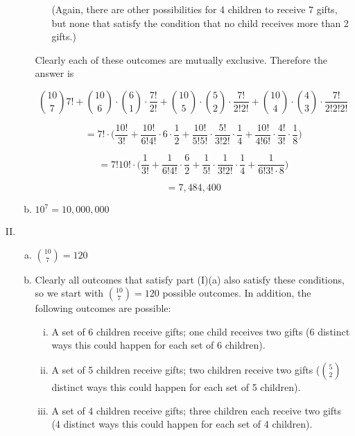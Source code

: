 \begin{enumerate}[(I)]
\begin{enumerate}[(a)]
\begin{enumerate}[(i)]
(Again, there are other possibilities for 4 children to receive 7 gifts, but none that satisfy the condition that no child receives more than 2 gifts.)

\end{enumerate}

Clearly each of these outcomes are mutually exclusive. Therefore the answer is

\[
\binom{10}{7}7! + \binom{10}{6} \cdot \binom{6}{1} \cdot \frac{7!}{2!} + \binom{10}{5} \cdot \binom{5}{2} \cdot \frac{7!}{2!2!} + \binom{10}{4} \cdot \binom{4}{3} \cdot \frac{7!}{2!2!2!} 
\]

\[
= 7!\cdot \bigg(\frac{10!}{3!} + \frac{10!}{6!4!}\cdot6 \cdot \frac{1}{2} + \frac{10!}{5!5!} \cdot \frac{5!}{3!2!} \cdot \frac{1}{4} + \frac{10!}{4!6!} \cdot \frac{4!}{3!} \cdot \frac{1}{8}  \bigg) 
\]

\[
= 7!10!\cdot \bigg(\frac{1}{3!} + \frac{1}{6!4!}\cdot\frac{6}{2} + \frac{1}{5!} \cdot \frac{1}{3!2!} \cdot \frac{1}{4} + \frac{1}{6!3!\cdot8}  \bigg) 
\]

\[
= \boxed{7,484,400}
\]

\item \(10^7 = \boxed{10,000,000} \)

\end{enumerate}

\item

\begin{enumerate}[(a)]

\item \(\binom{10}{7} = \boxed{120}\)

\item 

Clearly all outcomes that satisfy part (I)(a) also satisfy these conditions, so we start with \(\binom{10}{7} = 120\) possible outcomes. In addition, the following outcomes are possible:

\begin{enumerate}[(i)]

\item A set of 6 children receive gifts; one child receives two gifts (6 distinct ways this could happen for each set of 6 children).

\item A set of 5 children receive gifts; two children receive two gifts (\(\binom{5}{2}\) distinct ways this could happen for each set of 5 children).

\item A set of 4 children receive gifts; three children each receive two gifts (4 distinct ways this could happen for each set of 4 children). 


\end{enumerate}
\end{enumerate}
\end{enumerate}
